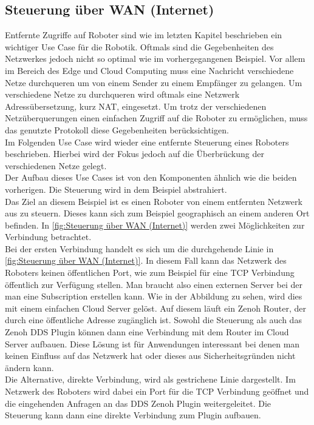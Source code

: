 
\subsection{Steuerung über WAN (Internet)} %
\label{sub:Steuerung über WAN (Internet)}

Entfernte Zugriffe auf Roboter sind wie im letzten Kapitel beschrieben ein wichtiger Use Case für die Robotik. Oftmals sind die Gegebenheiten des Netzwerkes jedoch nicht so optimal wie im vorhergegangenen Beispiel. Vor allem im Bereich des Edge und Cloud Computing muss eine Nachricht verschiedene Netze durchqueren um von einem Sender zu einem Empfänger zu gelangen. Um verschiedene Netze zu durchqueren wird oftmals eine Netzwerk Adressübersetzung, kurz NAT, eingesetzt. Um trotz der verschiedenen Netzüberquerungen einen einfachen Zugriff auf die Roboter zu ermöglichen, muss das genutzte Protokoll diese Gegebenheiten berücksichtigen.\\
Im Folgenden Use Case wird wieder eine entfernte Steuerung eines Roboters beschrieben. Hierbei wird der Fokus jedoch auf die Überbrückung der verschiedenen Netze gelegt.\\

Der Aufbau dieses Use Cases ist von den Komponenten ähnlich wie die beiden vorherigen. Die Steuerung wird in dem Beispiel abstrahiert.\\
Das Ziel an diesem Beispiel ist es einen Roboter von einem entfernten Netzwerk aus zu steuern. Dieses kann sich zum Beispiel geographisch an einem anderen Ort befinden. In \ref{fig:Steuerung über WAN (Internet)} werden zwei Möglichkeiten zur Verbindung betrachtet.\\
Bei der ersten Verbindung handelt es sich um die durchgehende Linie in \ref{fig:Steuerung über WAN (Internet)}. In diesem Fall kann das Netzwerk des Roboters keinen öffentlichen Port, wie zum Beispiel für eine TCP Verbindung öffentlich zur Verfügung stellen. Man braucht also einen externen Server bei der man eine Subscription erstellen kann. Wie in der Abbildung zu sehen, wird dies mit einem einfachen Cloud Server gelöst. Auf diesem läuft ein Zenoh Router, der durch eine öffentliche Adresse zugänglich ist. Sowohl die Steuerung als auch das Zenoh DDS Plugin können dann eine Verbindung mit dem Router im Cloud Server aufbauen. Diese Lösung ist für Anwendungen interessant bei denen man keinen Einfluss auf das Netzwerk hat oder dieses aus Sicherheitsgründen nicht ändern kann.\\
Die Alternative, direkte Verbindung, wird als gestrichene Linie dargestellt. Im Netzwerk des Roboters wird dabei ein Port für die TCP Verbindung geöffnet und die eingehenden Anfragen an das DDS Zenoh Plugin weitergeleitet. Die Steuerung kann dann eine direkte Verbindung zum Plugin aufbauen.\\

